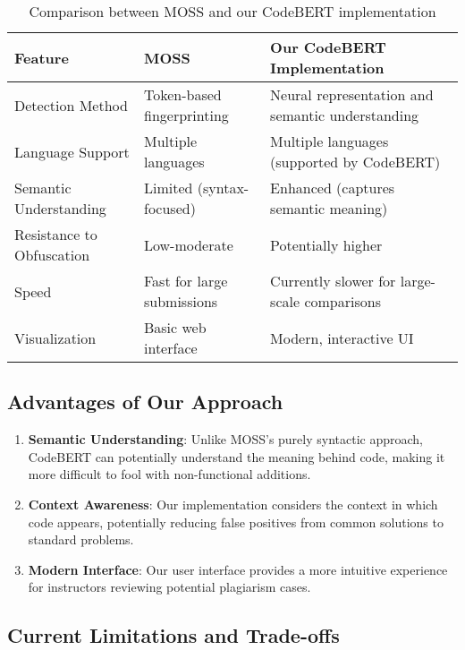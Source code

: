 \documentclass[12pt, titlepage]{article}
\begin{document}
\begin{table}[h]
\centering
\begin{tabular}{|p{3cm}|p{5cm}|p{5cm}|}
\hline
\textbf{Feature} & \textbf{MOSS} & \textbf{Our CodeBERT Implementation} \\
\hline
Detection Method & Token-based fingerprinting & Neural representation and semantic understanding \\
\hline
Language Support & Multiple languages & Multiple languages (supported by CodeBERT) \\
\hline
Semantic Understanding & Limited (syntax-focused) & Enhanced (captures semantic meaning) \\
\hline
Resistance to Obfuscation & Low-moderate & Potentially higher \\
\hline
Speed & Fast for large submissions & Currently slower for large-scale comparisons \\
\hline
Visualization & Basic web interface & Modern, interactive UI \\
\hline
\end{tabular}
\caption{Comparison between MOSS and our CodeBERT implementation}
\label{tab:comparison}
\end{table}

\subsection{Advantages of Our Approach}

\begin{enumerate}
    \item \textbf{Semantic Understanding}: Unlike MOSS's purely syntactic approach, CodeBERT can potentially understand the meaning behind code, making it more difficult to fool with non-functional additions.

    \item \textbf{Context Awareness}: Our implementation considers the context in which code appears, potentially reducing false positives from common solutions to standard problems.

    \item \textbf{Modern Interface}: Our user interface provides a more intuitive experience for instructors reviewing potential plagiarism cases.
\end{enumerate}

\subsection{Current Limitations and Trade-offs}
\end{document}
